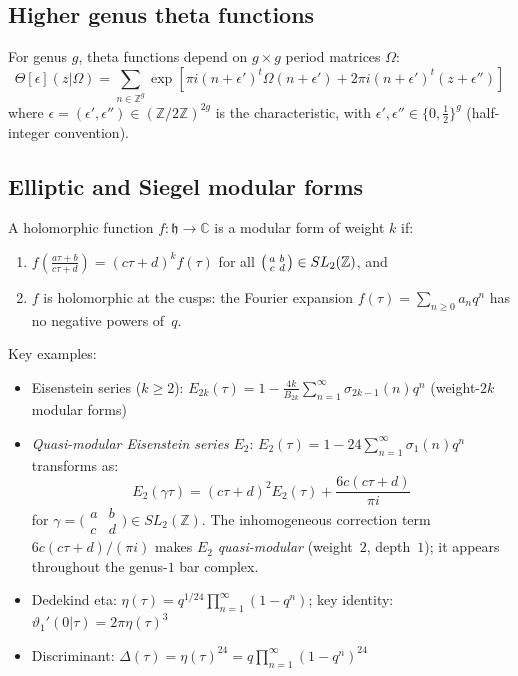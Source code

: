\subsection{Higher genus theta functions}

For genus $g$, theta functions depend on $g \times g$ period matrices $\Omega$:
\[\Theta[\epsilon](z|\Omega) = \sum_{n \in \mathbb{Z}^g} \exp\left[\pi i(n+\epsilon')^t\Omega(n+\epsilon') + 2\pi i(n+\epsilon')^t(z+\epsilon'')\right]\]
where $\epsilon = (\epsilon', \epsilon'') \in (\mathbb{Z}/2\mathbb{Z})^{2g}$ is the characteristic, with $\epsilon', \epsilon'' \in \{0, \tfrac{1}{2}\}^g$ (half-integer convention).

\subsection{Elliptic and Siegel modular forms}

\begin{definition}
A holomorphic function $f: \mathfrak{h} \to \mathbb{C}$ is a modular form of weight $k$ if:
\begin{enumerate}
\item $f\left(\frac{a\tau+b}{c\tau+d}\right) = (c\tau+d)^k f(\tau)$ for all $\begin{psmallmatrix} a & b \\ c & d \end{psmallmatrix} \in SL_2(\mathbb{Z})$, and
\item $f$ is holomorphic at the cusps: the Fourier expansion $f(\tau) = \sum_{n \geq 0} a_n q^n$ has no negative powers of~$q$.
\end{enumerate}
\end{definition}

Key examples:
\begin{itemize}
\item Eisenstein series ($k \geq 2$): $E_{2k}(\tau) = 1 - \frac{4k}{B_{2k}}\sum_{n=1}^\infty \sigma_{2k-1}(n)q^n$ (weight-$2k$ modular forms)
\item \emph{Quasi-modular Eisenstein series} $E_2$: $E_2(\tau) = 1 - 24\sum_{n=1}^\infty \sigma_1(n)q^n$ transforms as:
\[E_2(\gamma\tau) = (c\tau+d)^2 E_2(\tau) + \frac{6c(c\tau+d)}{\pi i}\]
for $\gamma = \bigl(\begin{smallmatrix} a & b \\ c & d \end{smallmatrix}\bigr) \in SL_2(\mathbb{Z})$.  The inhomogeneous correction term $6c(c\tau+d)/(\pi i)$ makes $E_2$ \emph{quasi-modular} (weight~$2$, depth~$1$); it appears throughout the genus-$1$ bar complex.
\item Dedekind eta: $\eta(\tau) = q^{1/24}\prod_{n=1}^\infty(1-q^n)$; key identity: $\vartheta_1'(0|\tau) = 2\pi\eta(\tau)^3$
\item Discriminant: $\Delta(\tau) = \eta(\tau)^{24} = q\prod_{n=1}^\infty(1-q^n)^{24}$
\end{itemize}

